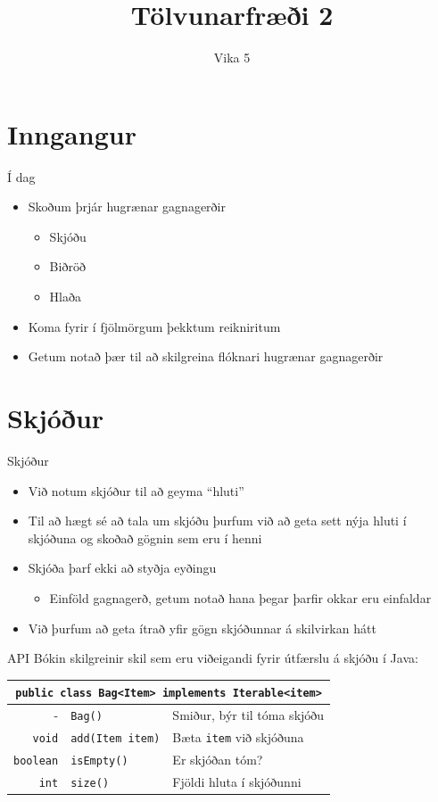 \documentclass[handout]{beamer}
\title{Tölvunarfræði 2}
\subtitle{Vika 5}
\begin{document}
\begin{frame}
\titlepage
\end{frame}

\section{Inngangur}

\begin{frame}{Í dag}
\begin{itemize}
 \item Skoðum þrjár hugrænar gagnagerðir
 \begin{itemize}
  \item Skjóðu 
  \item Biðröð 
  \item Hlaða 
 \end{itemize}
 \item Koma fyrir í fjölmörgum þekktum reikniritum
 \item Getum notað þær til að skilgreina flóknari hugrænar gagnagerðir
\end{itemize}
\end{frame}

\section{Skjóður}

\begin{frame}{Skjóður}
\begin{itemize}
 \item Við notum skjóður til að geyma ``hluti''
 \item Til að hægt sé að tala um skjóðu þurfum við að geta sett nýja hluti í skjóðuna og skoðað gögnin sem eru í henni
 \item Skjóða þarf ekki að styðja eyðingu
 \begin{itemize}
  \item Einföld gagnagerð, getum notað hana þegar þarfir okkar eru einfaldar
 \end{itemize}
 \item Við þurfum að geta ítrað yfir gögn skjóðunnar á skilvirkan hátt
\end{itemize}
\end{frame}

\begin{frame}{API}
Bókin skilgreinir skil sem eru viðeigandi fyrir útfærslu á skjóðu í Java:
\begin{center}
\begin{tabular}{rll}
\toprule
\multicolumn{3}{c}{\texttt{public class Bag<Item> implements Iterable<item>}}\\
\midrule
-&\texttt{Bag()}& Smiður, býr til tóma skjóðu\\
\texttt{void}&\texttt{add(Item item)}&Bæta \texttt{item} við skjóðuna\\
\texttt{boolean}&\texttt{isEmpty()}&Er skjóðan tóm?\\
\texttt{int}&\texttt{size()}&Fjöldi hluta í skjóðunni\\
\bottomrule
\end{tabular}
\end{center}
\end{frame}
\end{document}
